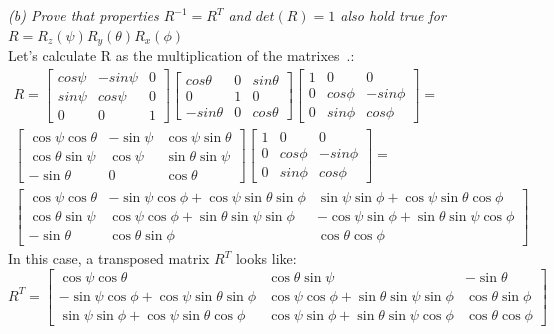 \documentclass[a4paper, twoside, english]{article}
\begin{document}
{\textit{(b) Prove that properties $R^{-1} = R^T$ and $det(R)=1$ also hold true for $R = R_z(\psi)R_y(\theta)R_x(\phi)$}\\
Let's calculate R as the multiplication of the matrixes~\cite{Stricker2021}.: 
\begin{equation}
\begin{gathered}	
R=	 \left[
	\begin{array}{ccc}
		cos \psi & -sin \psi & 0 \\
		sin \psi & cos \psi & 0 \\
		0 & 0 & 1
	\end{array}
	\right]
	\left[
	\begin{array}{ccc}
		cos \theta & 0 & sin \theta \\
		0 & 1 & 0 \\
		-sin \theta & 0 & cos \theta
	\end{array}
	\right]
	\left[
	\begin{array}{ccc}
		1 & 0 & 0 \\
		0 & cos \phi & -sin \phi \\
		0 & sin \phi & cos \phi
	\end{array}
	\right]=\\
	\left[
	\begin{array}{ccc}
		\cos\psi\cos\theta & -\sin\psi &\cos\psi\sin\theta\\
		\cos\theta\sin\psi & \cos\psi & \sin\theta\sin\psi\\
		-\sin\theta & 0 & \cos\theta
	\end{array}
	\right]
	\left[
	\begin{array}{ccc}
		1 & 0 & 0 \\
		0 & cos \phi & -sin \phi \\
		0 & sin \phi & cos \phi
	\end{array}
	\right]=\\
	\left[
	\begin{array}{ccc}
		\cos\psi\cos\theta & -\sin\psi\cos\phi+\cos\psi\sin\theta\sin\phi & \sin\psi\sin\phi+\cos\psi\sin\theta\cos\phi\\
		\cos\theta\sin\psi & \cos\psi\cos\phi+\sin\theta\sin\psi\sin\phi  & -\cos\psi\sin\phi+\sin\theta\sin\psi\cos\phi\\
		-\sin\theta & \cos\theta\sin\phi & \cos\theta\cos\phi
	\end{array}
	\right]
	\label{eq:kmatrixZYX}
\end{gathered}	
\end{equation}
In this case, a transposed matrix $R^T$ looks like:
\begin{equation*}
	R^T=\left[
	\begin{array}{ccc}
		\cos\psi\cos\theta & \cos\theta\sin\psi & -\sin\theta\\
		-\sin\psi\cos\phi+\cos\psi\sin\theta\sin\phi & \cos\psi\cos\phi+\sin\theta\sin\psi\sin\phi & \cos\theta\sin\phi\\
		\sin\psi\sin\phi+\cos\psi\sin\theta\cos\phi & \cos\psi\sin\phi+\sin\theta\sin\psi\cos\phi & \cos\theta\cos\phi
	\end{array}
	\right]
	\label{eq:kmatrixZYXT}
\end{equation*}

}
\end{document}
